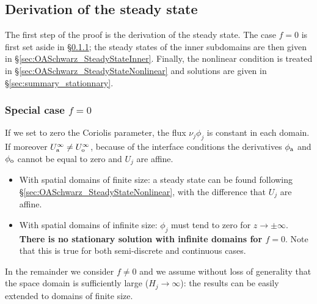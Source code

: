 \subsection{Derivation of the steady state}
\label{sec:OASchwarz_SteadyState}
The first step of the proof is the derivation of the
steady state. The case $f=0$ is first set aside in
\S\ref{sec:OASchwarz_SteadyStatef0}; the steady states of
the inner subdomains are then given in 
\S\ref{sec:OASchwarz_SteadyStateInner}.
Finally, the nonlinear condition is treated
in \S\ref{sec:OASchwarz_SteadyStateNonlinear}
and solutions are given in \S\ref{sec:summary_stationnary}.
\subsubsection{Special case $f=0$}
\label{sec:OASchwarz_SteadyStatef0}
If we set to zero the Coriolis parameter,
the flux $\nu_j\phi_j$ is constant in each domain.
If moreover $U_{\rm a}^{\infty} \neq U_{\rm o}^{\infty}$,
because of the interface conditions
the derivatives $\phi_{\rm a}$ and $\phi_{\rm o}$
cannot be equal to zero and $U_j$ are affine.
\begin{itemize}
	\item With spatial domains of finite size:
	a steady state can be found following
	\S\ref{sec:OASchwarz_SteadyStateNonlinear}, with
		the difference that $U_j$ are affine.
	\item With spatial domains of infinite size:
	$\phi_j$ must tend to zero for $z\rightarrow \pm \infty$.
\textbf{There is no stationary solution with infinite domains
for $f=0$}. Note that this is true for both semi-discrete
and continuous cases.
\end{itemize}
In the remainder we consider $f \neq 0$ and we assume without loss of
generality that the space domain is sufficiently
large ($H_j \rightarrow \infty$): the results can be easily
extended to domains of finite size.
